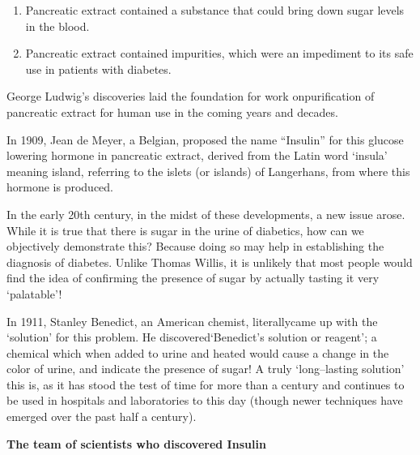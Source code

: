 \begin{enumerate}
\itemsep=0pt
\item Pancreatic extract contained a substance that could bring down sugar levels in the blood.
\item Pancreatic extract contained impurities, which were an impediment to its safe use in patients with diabetes.
\end{enumerate}

George Ludwig’s discoveries laid the foundation for work on\break purification of pancreatic extract for human use in the coming years and decades.

In 1909, Jean de Meyer, a Belgian, proposed the name “Insulin” for this glucose lowering hormone in pancreatic extract, derived from the Latin word ‘insula’ meaning island, referring to the islets (or islands) of Langerhans, from where this hormone is produced.

In the early 20th century, in the midst of these developments, a new issue arose. While it is true that there is sugar in the urine of diabetics, how can we objectively demonstrate this? Because doing so may help in establishing the diagnosis of diabetes. Unlike Thomas Willis, it is unlikely that most people would find the idea of confirming the presence of sugar by actually tasting it very ‘palatable’!

In 1911, Stanley Benedict, an American chemist, literally\break came up with the ‘solution’ for this problem. He discovered\break ‘Benedict’s solution or reagent’; a chemical which when added to urine and heated would cause a change in the color of urine, and indicate the presence of sugar! A truly ‘long–lasting solution’ this is, as it has stood the test of time for more than a century and continues to be used in hospitals and laboratories to this day (though newer techniques have emerged over the past half a century).

\begin{center}
\textbf{The team of scientists who discovered Insulin}
\end{center}

